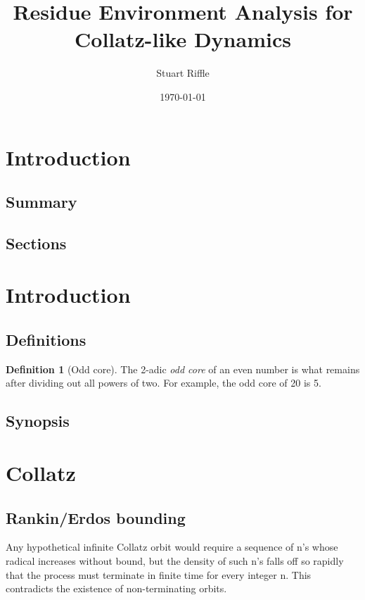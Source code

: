 \documentclass[12pt]{article}
\title{Residue Environment Analysis for Collatz-like Dynamics}
\author{Stuart Riffle}
\date{\today}
\theoremstyle{plain}
\theoremstyle{definition}
\newtheorem{definition}[theorem]{Definition}
\begin{document}
\maketitle
\begin{abstract}
\end{abstract}

\section{Introduction}
    \subsection{Summary}
    \subsection{Sections}

\section{Introduction}
    \subsection{Definitions}
        \begin{definition}[Odd core]
        The 2-adic \emph{odd core} of an even number is what remains after dividing out all powers of two. For example, the odd core of 20 is 5.
        \end{definition}

    \subsection{Synopsis}

\section{Collatz}
    \subsection{Rankin/Erdos bounding}
    Any hypothetical infinite Collatz orbit would require a sequence of n’s whose radical increases without bound, but the density of such n’s falls off so rapidly that the process must terminate in finite time for every integer n. This contradicts the existence of non-terminating orbits.

    
\end{document}
